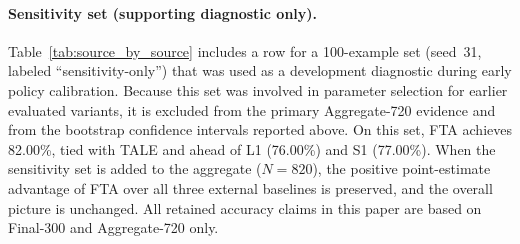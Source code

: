 \paragraph{Sensitivity set (supporting diagnostic only).}
Table~\ref{tab:source_by_source} includes a row for a 100-example set
(seed~31, labeled ``sensitivity-only'') that was used as a development
diagnostic during early policy calibration.
Because this set was involved in parameter selection for earlier evaluated
variants, it is excluded from the primary Aggregate-720 evidence and from the
bootstrap confidence intervals reported above.
On this set, FTA achieves 82.00\%, tied with TALE and ahead of L1 (76.00\%)
and S1 (77.00\%).
When the sensitivity set is added to the aggregate ($N = 820$), the positive
point-estimate advantage of FTA over all three external baselines is preserved,
and the overall picture is unchanged.
All retained accuracy claims in this paper are based on Final-300 and
Aggregate-720 only.
